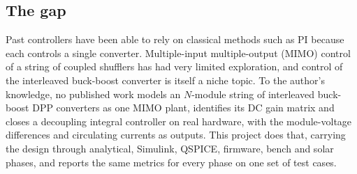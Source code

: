 \subsection{The gap}
\label{sec:gap}
Past controllers have been able to rely on classical methods such as PI because each controls a single converter. Multiple-input multiple-output (MIMO) control of a string of coupled shufflers has had very limited exploration, and control of the interleaved buck-boost converter is itself a niche topic. To the author's knowledge, no published work models an $N$-module string of interleaved buck-boost DPP converters as one MIMO plant, identifies its DC gain matrix and closes a decoupling integral controller on real hardware, with the module-voltage differences and circulating currents as outputs. This project does that, carrying the design through analytical, Simulink, QSPICE, firmware, bench and solar phases, and reports the same metrics for every phase on one set of test cases.
